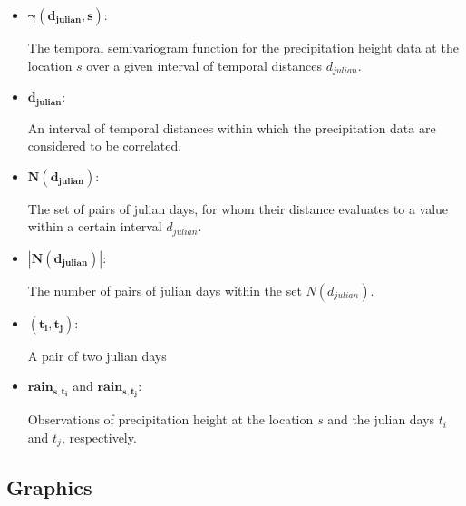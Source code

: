 \documentclass[
  12pt,
]{article}
\begin{document}
\begin{itemize}[label={}]
            \item$\mathbf{\gamma(d_{julian},s)}$:\\
            \begin{adjustwidth}{1cm}{0cm} The temporal semivariogram function for the precipitation height data at the location $s$ over a given interval of temporal distances $d_{julian}$. \end{adjustwidth}
            \item$\mathbf{d_{julian}}$:\\
            \begin{adjustwidth}{1cm}{0cm} An interval of temporal distances within which the precipitation data are considered to be correlated. \end{adjustwidth}
            \item$\mathbf{N(d_{julian})}$:\\
            \begin{adjustwidth}{1cm}{0cm} The set of pairs of julian days, for whom their distance evaluates to a value within a certain interval $d_{julian}$. \end{adjustwidth}
            \item$\mathbf{|N(d_{julian})|}$:\\
            \begin{adjustwidth}{1cm}{0cm} The number of pairs of julian days within the set $N(d_{julian})$. \end{adjustwidth}
            \item$\left(\mathbf{t_{i}},\mathbf{t_{j}}\right)$:\\
            \begin{adjustwidth}{1cm}{0cm} A pair of two julian days \end{adjustwidth}
            \item$\mathbf{rain_{s,t_{i}}}$ and $\mathbf{rain_{s,t_j}}$:\\
            \begin{adjustwidth}{1cm}{0cm} Observations of precipitation height at the location $s$ and the julian days $t_i$ and $t_j$, respectively. \end{adjustwidth}
  \end{itemize}

\newpage

\hypertarget{graphics}{%
\subsection{Graphics}\label{graphics}}
\end{document}
